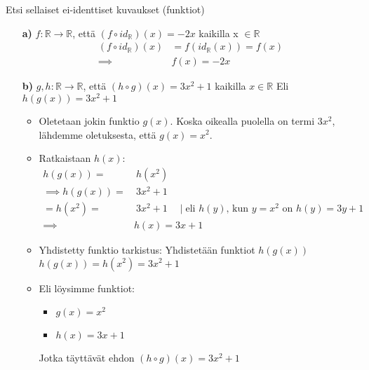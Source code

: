 \documentclass{article}
\begin{document}
    Etsi sellaiset ei-identtiset kuvaukset (funktiot)
    \begin{itemize}
        \item[\textbf{a)}] $f : \mathbb{R} \rightarrow \mathbb{R}$, että $(f \circ id_\mathbb{R})(x) = -2x$ kaikilla x $\in \mathbb{R}$
        \[
            \begin{aligned}
                (f \circ id_{\mathbb{R}})(x) &= f(id_{\mathbb{R}}(x)) = f(x) \\
                \implies & f(x) = -2x
            \end{aligned}
        \]

        \item[\textbf{b)}] $g, h: \mathbb{R} \rightarrow \mathbb{R}$, että $(h \circ g)(x) = 3x^2 + 1$ kaikilla $x \in \mathbb{R}$\newline
        Eli $h(g(x)) = 3x^2 + 1$
        \begin{itemize}
            \item Oletetaan jokin funktio $g(x)$. Koska oikealla puolella on termi $3x^2$, lähdemme oletuksesta, että $g(x) = x^2$.
            \item Ratkaistaan $h(x)$:
            \[
                \begin{aligned}
                    h(g(x)) = & \  h(x^2)\\
                    \implies h(g(x)) = & \ 3x^2 + 1\\
                    = h(x^2) = & \ 3x^2 + 1 \quad \mid \text{eli $h(y)$, kun $y = x^2$ on $h(y) = 3y + 1$} \\
                    \implies & h(x) = 3x + 1                                        
                \end{aligned}
            \]
            \item Yhdistetty funktio tarkistus:\newline
            Yhdistetään funktiot $h(g(x))$\newline
            $h(g(x)) = h(x^2) = 3x^2 + 1$
            \item Eli löysimme funktiot:
            \begin{itemize}
                \item $g(x) = x^2$
                \item $h(x) = 3x + 1$
            \end{itemize}
            Jotka täyttävät ehdon $(h \circ g)(x) = 3x^2 + 1$

            
        \end{itemize}




\end{itemize}
\end{document}
